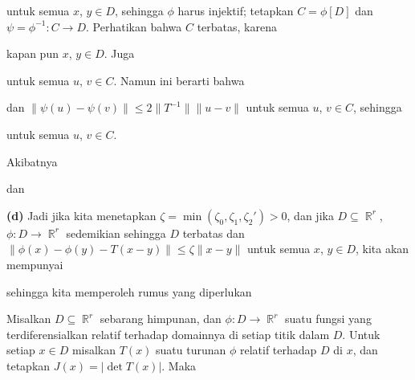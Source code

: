 {\noindent untuk semua $x$, $y\in D$, sehingga $\phi$ harus injektif;  tetapkan
$C=\phi[D]$ dan $\psi=\phi^{-1}:C\to D$.   Perhatikan bahwa $C$ terbatas,
karena


\noindent kapan pun $x$, $y\in D$.   Juga


\noindent untuk semua $u$, $v\in C$.   Namun ini berarti bahwa


\noindent dan $\|\psi(u)-\psi(v)\|\le 2\|T^{-1}\|\|u-v\|$ untuk semua $u$,
$v\in C$, sehingga


\noindent untuk semua $u$, $v\in C$.

Akibatnya


\noindent dan


\medskip

{\bf (d)} Jadi jika kita menetapkan $\zeta=\min(\zeta_0,\zeta_1,\zeta_2')>0$, dan jika
$D\subseteq\BbbR^r$, $\phi:D\to\BbbR^r$ sedemikian sehingga $D$ terbatas
dan
$\|\phi(x)-\phi(y)-T(x-y)\|\le\zeta\|x-y\|$ untuk semua $x$, $y\in D$, kita
akan mempunyai



\noindent sehingga kita memperoleh rumus yang diperlukan

}%

 Misalkan $D\subseteq\BbbR^r$ sebarang himpunan, dan
$\phi:D\to\BbbR^r$ suatu fungsi yang terdiferensialkan relatif terhadap domainnya
di setiap titik dalam $D$.   Untuk setiap $x\in D$ misalkan $T(x)$ suatu turunan
$\phi$ relatif terhadap $D$ di $x$, dan tetapkan $J(x)=|\det T(x)|$.   Maka

